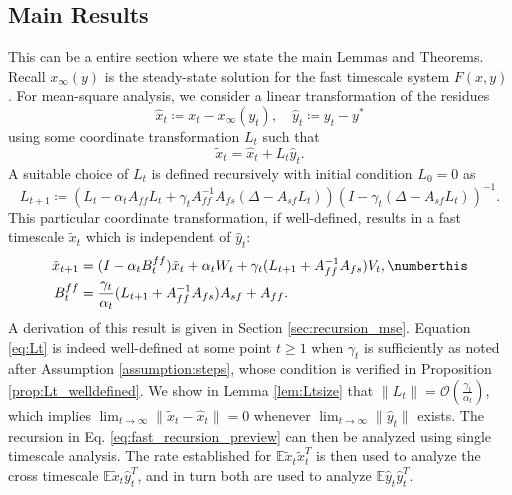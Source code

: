 \subsection{Main Results}
{\color{red}This can be a entire section where we state the main Lemmas and Theorems.}
Recall $x_\infty (y)$ is the steady-state solution for the fast timescale system $F(x, y)$.
For mean-square analysis, we consider a linear transformation of the residues
\begin{equation}
    \hat{x}_t \coloneqq x_t - x_\infty (y_t), \quad \hat{y}_t \coloneqq y_t - y^* 
\end{equation}
using some coordinate transformation $L_t$ such that
\begin{equation}
    \tilde{x}_t = \hat{x}_t + L_t \hat{y}_t .
\end{equation}
A suitable choice of $L_t$ is defined recursively with initial condition $L_0=0$ as
\begin{equation}\label{eq:Lt}
    L_{t+1} \coloneqq \left(L_t - \alpha_t A_{ff} L_t + \gamma_t A_{ff}^{-1} A_{fs}(\Delta - A_{sf} L_t)\right) (I - \gamma_t (\Delta - A_{sf} L_t))^{-1}  .
\end{equation}
This particular coordinate transformation, if well-defined, results in a fast timescale $\tilde{x}_t$ which is independent of $\hat{y}_t$:
\begin{align*}
    \tilde{x}_{t+1} &= (I - \alpha_t B_t^{ff}) \tilde{x}_t + \alpha_t W_t + \gamma_t (L_{t+1} + A_{ff}^{-1} A_{fs}) V_t ,
    \numberthis \label{eq:fast_recursion_preview}
    \\
    B^{ff}_t &= \frac{\gamma_t}{\alpha_t}(L_{t+1} + A_{ff}^{-1} A_{fs}) A_{sf} + A_{ff} .    
\end{align*}
A derivation of this result is given in Section \ref{sec:recursion_mse}.
Equation \eqref{eq:Lt} is indeed well-defined at some point $t \geq 1$ when $\gamma_t$ is sufficiently as noted after Assumption \ref{assumption:steps}, whose condition is verified in Proposition \ref{prop:Lt_welldefined}.
We show in Lemma \ref{lem:Ltsize} that $\lVert L_t \rVert = \mathcal{O}\left(\frac{\gamma_t}{\alpha_t}\right)$, which implies $\lim_{t \to \infty} \lVert \tilde{x}_t - \hat{x}_t \rVert = 0$ whenever $\lim_{t \to \infty} \lVert \hat{y}_t \rVert$ exists.
The recursion in Eq. \eqref{eq:fast_recursion_preview} can then be analyzed using single timescale analysis. 
The rate established for $\mathbb{E} \tilde{x}_t \tilde{x}_t^T$ is then used to analyze the cross timescale $\mathbb{E} \tilde{x}_t \hat{y}_t^T$, and in turn both are used to analyze $\mathbb{E} \hat{y}_t \hat{y}_t^T$.

